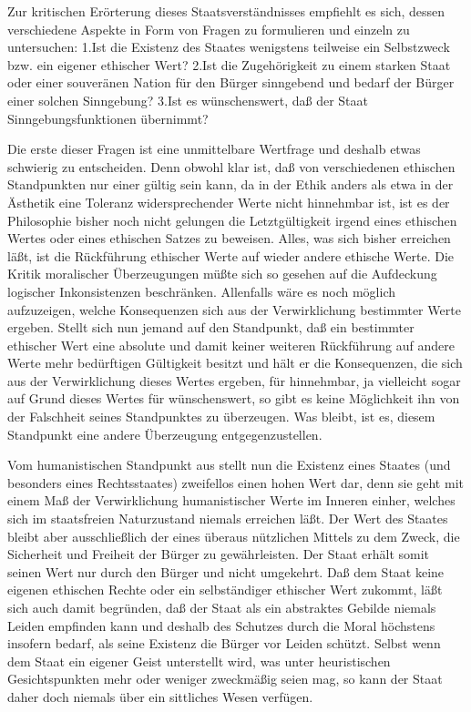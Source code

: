 \documentclass[12pt,a4paper]{article}
\begin{document}
Zur kritischen Erörterung dieses Staatsverständnisses empfiehlt es sich,
dessen verschiedene Aspekte in Form von Fragen zu formulieren und einzeln zu
untersuchen: 1.Ist die Existenz des Staates wenigstens teilweise ein
Selbstzweck bzw. ein eigener ethischer Wert? 2.Ist die Zugehörigkeit zu
einem starken Staat oder einer souveränen Nation für den Bürger sinngebend
und bedarf der Bürger einer solchen Sinngebung? 3.Ist es wünschenswert,
daß der Staat Sinngebungsfunktionen übernimmt?

Die erste dieser Fragen ist eine unmittelbare Wertfrage und deshalb etwas
schwierig zu entscheiden. Denn obwohl klar ist, daß von verschiedenen
ethischen Standpunkten nur einer gültig sein kann, da in der Ethik anders
als etwa in der Ästhetik eine Toleranz widersprechender Werte nicht
hinnehmbar ist, ist es der Philosophie bisher noch nicht gelungen die
Letztgültigkeit irgend eines ethischen Wertes oder eines ethischen Satzes zu
beweisen. Alles, was sich bisher erreichen läßt, ist die Rückführung
ethischer Werte auf wieder andere ethische Werte. Die Kritik moralischer
Überzeugungen müßte sich so gesehen auf die Aufdeckung logischer
Inkonsistenzen beschränken. Allenfalls wäre es noch möglich aufzuzeigen,
welche Konsequenzen sich aus der Verwirklichung bestimmter Werte ergeben.
Stellt sich nun jemand auf den Standpunkt, daß ein bestimmter ethischer Wert
eine absolute und damit keiner weiteren Rückführung auf andere Werte mehr
bedürftigen Gültigkeit besitzt und hält er die Konsequenzen, die sich aus
der Verwirklichung dieses Wertes ergeben, für hinnehmbar, ja vielleicht sogar
auf Grund dieses Wertes für wünschenswert, so gibt es keine Möglichkeit ihn
von der Falschheit seines Standpunktes zu überzeugen. Was bleibt, ist es,
diesem Standpunkt eine andere Überzeugung entgegenzustellen. 

Vom humanistischen Standpunkt aus stellt nun die Existenz ein\-es Staates (und
besonders eines Rechtsstaates) zweifel\/los einen hohen Wert dar, denn sie
geht mit einem Maß der Verwirklichung humanistischer Werte im Inneren einher,
welches sich im staatsfreien Naturzustand niemals erreichen läßt. Der Wert des
Staates bleibt aber ausschließlich der eines überaus nützlichen Mittels zu dem
Zweck, die Sicherheit und Freiheit der Bürger zu gewährleisten. Der Staat
erhält somit seinen Wert nur durch den Bürger und nicht umgekehrt. Daß dem
Staat keine eigenen ethischen Rechte oder ein selbständiger ethischer Wert
zukommt, läßt sich auch damit begründen, daß der Staat als ein abstraktes
Gebilde niemals Leiden empfinden kann und deshalb des Schutzes durch die Moral
höchstens insofern bedarf, als seine Existenz die Bürger vor Leiden schützt.
Selbst wenn dem Staat ein eigener Geist unterstellt wird, was unter
heuristischen Gesichtspunkten mehr oder weniger zweckmäßig seien mag, so kann
der Staat daher doch niemals über ein sittliches Wesen verfügen.
\end{document}
